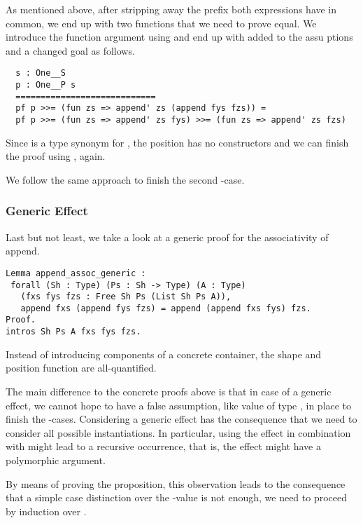 As mentioned above, after stripping away the prefix both expressions have in common, we end up with two functions that we need to prove equal.
We introduce the function argument  using  and end up with  added to the assu ptions and a changed goal as follows.

\begin{verbatim}
  s : One__S
  p : One__P s
  ============================
  pf p >>= (fun zs => append' zs (append fys fzs)) =
  pf p >>= (fun zs => append' zs fys) >>= (fun zs => append' zs fzs)
\end{verbatim}

Since  is a type synonym for , the position  has no constructors and we can finish the proof using , again.

We follow the same approach to finish the second -case.

\subsubsection{Generic Effect}
Last but not least, we take a look at a generic proof for the associativity of append.

\begin{verbatim}
Lemma append_assoc_generic :
 forall (Sh : Type) (Ps : Sh -> Type) (A : Type)
   (fxs fys fzs : Free Sh Ps (List Sh Ps A)),
   append fxs (append fys fzs) = append (append fxs fys) fzs.
Proof.
intros Sh Ps A fxs fys fzs.
\end{verbatim}

Instead of introducing components of a concrete container, the shape  and position function  are all-quantified.

The main difference to the concrete proofs above is that in case of a generic effect, we cannot hope to have a false assumption, like  value of type , in place to finish the -cases.
Considering a generic effect has the consequence that we need to consider all possible instantiations.
In particular, using the effect in combination with  might lead to a recursive occurrence, that is, the effect might have a polymorphic argument.

By means of proving the proposition, this observation leads to the consequence that a simple case distinction over the -value  is not enough, we need to proceed by induction over .

